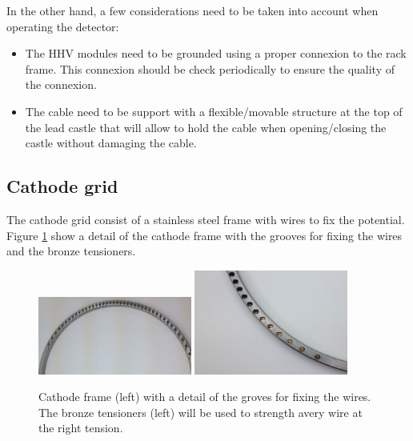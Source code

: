 %

In the other hand, a few considerations need to be taken into account when operating the detector:

\begin{itemize}
\item The HHV modules need to be grounded using a proper connexion to the rack frame. This connexion should be check periodically to ensure the quality of the connexion.
\item The cable need to be support with a flexible/movable structure at the top  of the lead castle that will allow to hold the cable when opening/closing the castle without damaging the cable.
\end{itemize}

\subsection{Cathode grid}

The cathode grid consist of a stainless steel frame with wires to fix the potential. Figure \ref{fig:cath} show a detail of the cathode frame with the grooves for fixing the wires and the bronze tensioners.

\begin{figure}[h!]
\centering
\includegraphics[width=0.45\textwidth]{img/cathode_1.jpg}
\includegraphics[width=0.45\textwidth]{img/cathode_tensioners.jpg}
\caption{Cathode frame (left) with a detail of the groves for fixing the wires. The bronze tensioners (left) will be used to strength avery wire at the right tension.} \label{fig:cath}
\end{figure}


